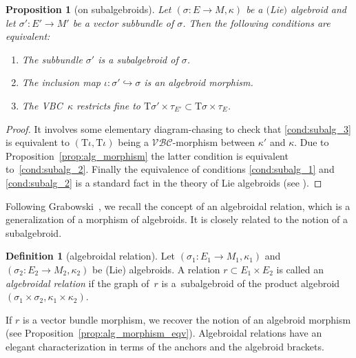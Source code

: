 \documentclass[pdftex]{sigma}
\newcommand{\ZM}{{VBC}} %
\newcommand{\ra}{\rightarrow}
\newcommand{\T}{\mathrm{T}} %
\newcommand{\catZM}{{\mathcal{VBC}}} %
\numberwithin{equation}{section}
\newtheorem{prop}[thm]{Proposition}
\theoremstyle{definition}
\newtheorem{df}[thm]{Definition}
\begin{document}
\begin{prop}[on subalgebroids]\label{p:subalgebroid} Let $(\sigma\colon\! E\!\ra\! M, \kappa)$ be a $($Lie$)$ algebroid and let \mbox{$\sigma'\colon\! E'\!\ra\! M'$} be a vector subbundle of $\sigma$. Then the following conditions are equivalent:
\begin{enumerate}[$(i)$]\itemsep=0pt
	\item\label{cond:subalg_1} The subbundle $\sigma'$ is a subalgebroid of $\sigma$.
	\item\label{cond:subalg_2} The inclusion map $\iota\colon \sigma'\hookrightarrow\sigma$ is an algebroid morphism.
	\item\label{cond:subalg_3} The \ZM\ $\kappa$ restricts fine to $\T\sigma'\times\tau_{E'}\subset \T\sigma\times\tau_{E}$.
\end{enumerate}
\end{prop}
\begin{proof}It involves some elementary diagram-chasing to check that \eqref{cond:subalg_3} is equivalent to $(\T\iota,\T\iota)$ being a $\catZM$-morphism between $\kappa'$ and $\kappa$. Due to Proposition~\ref{prop:alg_morphism} the latter condition is equivalent to~\eqref{cond:subalg_2}. Finally the equivalence of conditions \eqref{cond:subalg_1} and \eqref{cond:subalg_2} is a standard fact in the theory of Lie algebroids (see \cite[Chapter~4]{Mackenzie_lie_2005}).
\end{proof}

Following Grabowski~\cite{JG_mod_class_skew_alg_rel_2012}, we recall the concept of an algebroidal relation, which is a generalization of a morphism of algebroids. It is closely related to the notion of a subalgebroid.

\begin{df}[algebroidal relation]\label{df:alg_relation} Let $(\sigma_1\colon E_1\ra M_1,\kappa_1)$ and $(\sigma_2\colon E_2\ra M_2,\kappa_2)$ be (Lie) algebroids. A relation $r\subset E_1 \times E_2$ is called an \emph{algebroidal relation} if the graph of~$r$ is a~subalgebroid of the product algebroid $(\sigma_1\times \sigma_2,\kappa_1\times\kappa_2)$.
\end{df}
If $r$ is a vector bundle morphism, we recover the notion of an algebroid morphism (see Proposition~\ref{prop:alg_morphism_eqv}). Algebroidal relations have an elegant characterization in terms of the anchors and the algebroid brackets.
\end{document}
